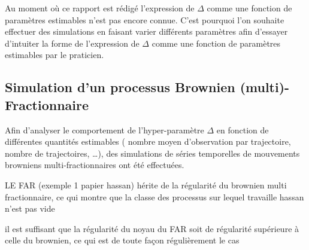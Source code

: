 
Au moment où ce rapport est rédigé l'expression de $\Delta$ comme une fonction de paramètres estimables n'est pas encore connue. C'est pourquoi l'on souhaite effectuer des simulations en faisant varier différents paramètres afin d'essayer d'intuiter la forme de l'expression de $\Delta$ comme une fonction de paramètres estimables par le praticien.

\citationrequise

\subsection{Simulation d'un processus Brownien (multi)-Fractionnaire}

Afin d'analyser le comportement de l'hyper-paramètre $\Delta$ en fonction de différentes quantités estimables ( nombre moyen d'observation par trajectoire, nombre de trajectoires, \dots ), des simulations de séries temporelles de mouvements browniens multi-fractionnaires ont été effectuées. 







LE FAR (exemple 1 papier hassan) hérite de la régularité du brownien multi fractionnaire, ce qui montre que la classe des processus sur lequel travaille hassan n'est pas vide

il est suffisant que la régularité du noyau du FAR soit de régularité supérieure à celle du brownien, ce qui est de toute façon régulièrement le cas


